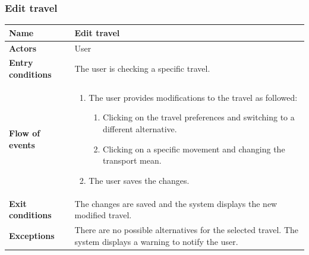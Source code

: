 \subsubsection{Edit travel}
\begin{table}[!h]
	\centering
	{\renewcommand{\arraystretch}{2}%
		\begin{tabular}{|l|p{12cm}|}
			\hline
			\textbf{Name} 				& \textbf{Edit travel} \\ \hline
			\textbf{Actors} 			& User \\ \hline
			\textbf{Entry conditions} 	& The user is checking a specific travel. \\ \hline
			\textbf{Flow of events}		& \begin{minipage}[t]{0.75\textwidth}
				\begin{enumerate}
					\item The user provides modifications to the travel as followed:
					\begin{enumerate}
						\item Clicking on the travel preferences and switching to a different alternative.
						\item Clicking on a specific movement and changing the transport mean.
					\end{enumerate}
					\item The user saves the changes.
				\end{enumerate}
			\end{minipage}	\\ \hline
			\textbf{Exit conditions}	& The changes are saved and the system displays the new modified travel.   \\ \hline
			\textbf{Exceptions}			& There are no possible alternatives for the selected travel. The system displays a warning to notify the user.  \\ \hline
	\end{tabular}}
\end{table}

